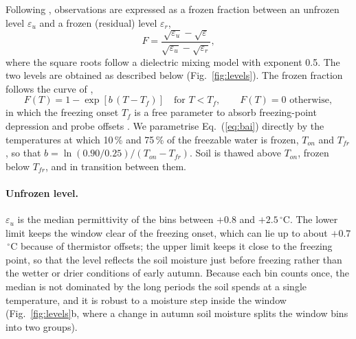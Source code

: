 \documentclass[essd,manuscript]{copernicus}
\begin{document}
Following \citet{cohen2021}, observations are expressed as a frozen fraction
between an unfrozen level $\varepsilon_u$ and a frozen (residual) level
$\varepsilon_r$,
\begin{equation}
F = \frac{\sqrt{\varepsilon_u} - \sqrt{\varepsilon}}{\sqrt{\varepsilon_u} - \sqrt{\varepsilon_r}},
\label{eq:fraction}
\end{equation}
where the square roots follow a dielectric mixing model with exponent 0.5.
The two levels are obtained as described below (Fig.~\ref{fig:levels}).
The frozen fraction follows the curve of \citet{bai2018},
\begin{equation}
F(T) = 1 - \exp\left[b\,(T - T_f)\right] \quad \text{for } T < T_f, \qquad F(T) = 0 \text{ otherwise},
\label{eq:bai}
\end{equation}
in which the freezing onset $T_f$ is a free parameter to absorb freezing-point
depression and probe offsets \citep{salmabadi2026}. We parametrise
Eq.~(\ref{eq:bai}) directly by the temperatures at which 10\,\% and 75\,\% of the
freezable water is frozen, $T_{on}$ \citep{cohen2021} and $T_{fr}$
\citep{salmabadi2026}, so that
$b = \ln(0.90/0.25)/(T_{on}-T_{fr})$. Soil is thawed above $T_{on}$, frozen
below $T_{fr}$, and in transition between them.

\paragraph{Unfrozen level.} $\varepsilon_u$ is the median permittivity of the
bins between $+0.8$ and $+2.5$\,$^{\circ}$C. The lower limit keeps the window
clear of the freezing onset, which can lie up to about $+0.7$\,$^{\circ}$C
because of thermistor offsets; the upper limit keeps it close to the freezing
point, so that the level reflects the soil moisture just before freezing rather
than the wetter or drier conditions of early autumn. Because each bin counts
once, the median is not dominated by the long periods the soil spends at a
single temperature, and it is robust to a moisture step inside the window
(Fig.~\ref{fig:levels}b, where a change in autumn soil moisture splits the window bins into two
groups).
\end{document}
